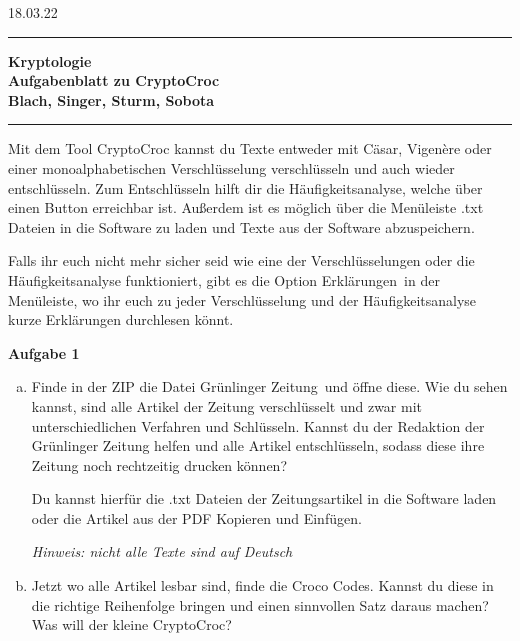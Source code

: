 \documentclass[a4paper,11pt]{scrreprt}
\begin{document}
%
\hfill \parbox{22mm} %
{ 
18.03.22
}

\vspace{3ex}  %



\rule{\textwidth}{1pt}                                   %
%
\begin{center} %
\textbf{ %
Kryptologie \\[1ex] %
%
{ \Large Aufgabenblatt  zu CryptoCroc } \\[1ex] 
Blach, Singer, Sturm, Sobota
}
\end{center}
% 
\rule{\textwidth}{1pt}                                 %
\vspace{1ex}  %


Mit dem Tool CryptoCroc kannst du Texte entweder mit Cäsar, Vigenère oder einer monoalphabetischen Verschlüsselung verschlüsseln und auch wieder entschlüsseln. Zum Entschlüsseln hilft dir die Häufigkeitsanalyse, welche über einen Button erreichbar ist. Außerdem ist es möglich über die Menüleiste .txt Dateien in die Software zu laden und Texte aus der Software abzuspeichern.

Falls ihr euch nicht mehr sicher seid wie eine der Verschlüsselungen oder die Häufigkeitsanalyse funktioniert, gibt es die Option \glqq Erklärungen\grqq \ in der Menüleiste, wo ihr euch zu jeder Verschlüsselung und der Häufigkeitsanalyse kurze Erklärungen durchlesen könnt.

\vspace{5ex}

\textbf{\Large{Aufgabe 1}}

\begin{enumerate}[a)]
\item Finde in der ZIP die Datei \glqq Grünlinger Zeitung\grqq \ und öffne diese. Wie du sehen kannst, sind alle Artikel der Zeitung verschlüsselt und zwar mit unterschiedlichen Verfahren und Schlüsseln. Kannst du der Redaktion der Grünlinger Zeitung helfen und alle Artikel entschlüsseln, sodass diese ihre Zeitung noch rechtzeitig drucken können?

Du kannst hierfür die  .txt Dateien der Zeitungsartikel in die Software laden oder die Artikel aus der PDF Kopieren und Einfügen.

\textit{Hinweis: nicht alle Texte sind auf Deutsch}
\item Jetzt wo alle Artikel lesbar sind, finde die Croco Codes. Kannst du diese in die richtige Reihenfolge bringen und einen sinnvollen Satz daraus machen? Was will der kleine CryptoCroc?


\end{enumerate}
\end{document}
